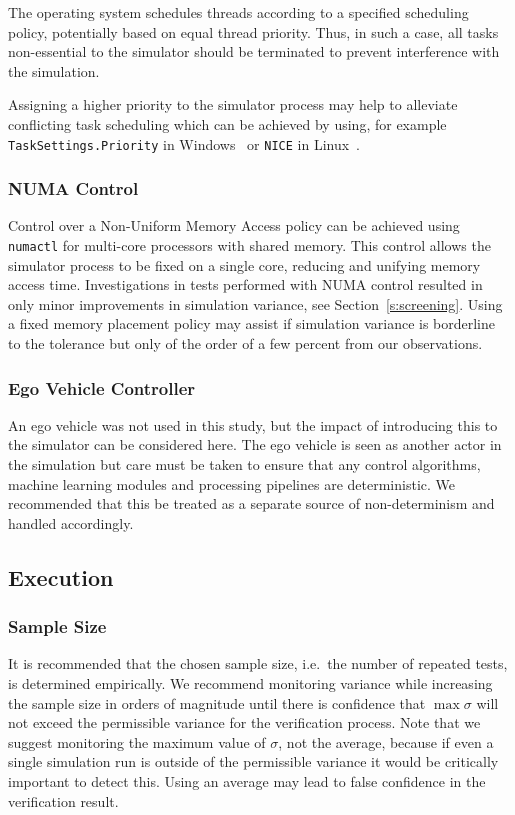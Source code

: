 The operating system schedules threads according to a specified scheduling policy, potentially based on equal thread priority. Thus, in such a case, all tasks non-essential to the simulator should be terminated to prevent interference with the simulation. 

Assigning a higher priority to the simulator process may help to alleviate conflicting task scheduling which can be achieved by using, for example \texttt{TaskSettings.Priority} in Windows~\cite{TaskSettingWindows} or \texttt{NICE} in Linux~\cite{Nice_linux}.

\subsubsection{NUMA Control}
Control over a Non-Uniform Memory Access policy can be achieved using \texttt{numactl} for multi-core processors with shared memory. This control allows the simulator process to be fixed on a single core, reducing and unifying memory access time. Investigations in tests performed with NUMA control resulted in only minor improvements in simulation variance, see Section~\ref{s:screening}. Using a fixed memory placement policy may assist if simulation variance is borderline to the tolerance but only of the order of a few percent from our observations.

\subsubsection{Ego Vehicle Controller} 
An ego vehicle was not used in this study, but the impact of introducing this to the simulator can be considered here. The ego vehicle is seen as another actor in the simulation but care must be taken to ensure that any control algorithms, machine learning modules and processing pipelines are deterministic. We recommended that this be treated as a separate source of non-determinism and handled accordingly. 


\subsection{Execution}

\subsubsection{Sample Size}
It is recommended that the chosen sample size, i.e.\ the number of repeated tests, is determined empirically. We recommend monitoring variance while increasing the sample size in orders of magnitude until there is confidence that $\max\sigma$ will not exceed the permissible variance for the verification process. Note that we suggest monitoring the maximum value of $\sigma$, not the average, 
%
%
because if even a single simulation run is outside of the permissible variance it would be critically important to detect this. Using an average may lead to false confidence in the verification result.

